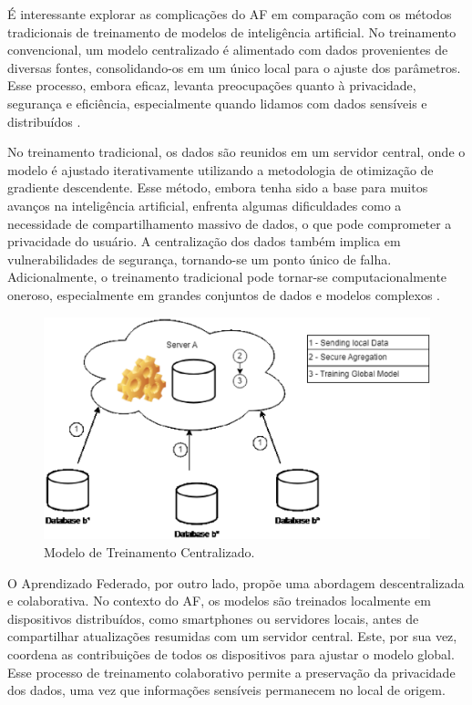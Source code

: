 É interessante explorar as complicações do AF em comparação com os métodos tradicionais de treinamento de modelos de inteligência artificial. No treinamento convencional, um modelo centralizado é alimentado com dados provenientes de diversas fontes, consolidando-os em um único local para o ajuste dos parâmetros. Esse processo, embora eficaz, levanta preocupações quanto à privacidade, segurança e eficiência, especialmente quando lidamos com dados sensíveis e distribuídos \cite{goodfellow2016deep}.

No treinamento tradicional, os dados são reunidos em um servidor central, onde o modelo é ajustado iterativamente utilizando a metodologia de otimização de gradiente descendente. Esse método, embora tenha sido a base para muitos avanços na inteligência artificial, enfrenta algumas dificuldades como a necessidade de compartilhamento massivo de dados, o que pode comprometer a privacidade do usuário. A centralização dos dados também implica em vulnerabilidades de segurança, tornando-se um ponto único de falha. Adicionalmente, o treinamento tradicional pode tornar-se computacionalmente oneroso, especialmente em grandes conjuntos de dados e modelos complexos \cite{sutskever2013importance}.

\begin{figure}[ht]
    \centering
    \includegraphics[scale=0.50]{figuras/teorica/centralizedDiagram.eps}
    \caption{Modelo de Treinamento Centralizado.}
    \label{fig:TraditionalCentralizedLearning}
\end{figure}

O Aprendizado Federado, por outro lado, propõe uma abordagem descentralizada e colaborativa. No contexto do AF, os modelos são treinados localmente em dispositivos distribuídos, como smartphones ou servidores locais, antes de compartilhar atualizações resumidas com um servidor central. Este, por sua vez, coordena as contribuições de todos os dispositivos para ajustar o modelo global. Esse processo de treinamento colaborativo permite a preservação da privacidade dos dados, uma vez que informações sensíveis permanecem no local de origem\cite{mcmahan2017communication}.

